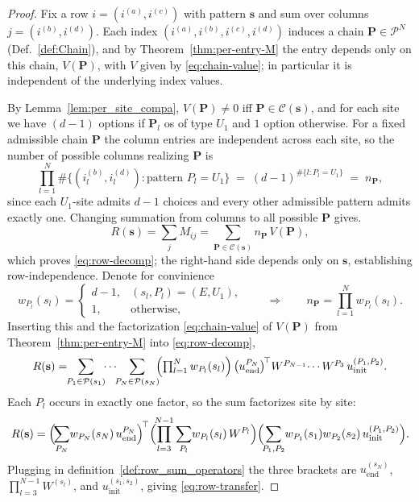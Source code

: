 \documentclass[12pt,a4paper]{article}
\begin{document}
\begin{proof}
Fix a row $i=(i^{(a)},i^{(c)})$ with pattern $\mathbf{s}$ and sum over columns $j=(i^{(b)},i^{(d)})$. Each index $(i^{(a)},i^{(b)},i^{(c)},i^{(d)})$ induces a chain $\mathbf{P}\in\mathcal{P}^N$ (Def.~\ref{def:Chain}), and by Theorem~\ref{thm:per-entry-M} the entry depends only on this chain, $V(\mathbf{P})$, with $V$ given by \eqref{eq:chain-value}; in particular it is independent of the underlying index values.

By Lemma~\ref{lem:per_site_compa}, $V(\mathbf{P})\neq 0$ iff $\mathbf{P}\in\mathcal{C}(\mathbf{s})$, and for each site we have $(d-1)$  options if $\mathbf{P}_l$  os of type $U_1$  and $1$  option otherwise. For a fixed admissible chain $\mathbf{P}$ the column entries are independent across each site, so the number of possible columns realizing $\mathbf{P}$ is
\[
\prod_{l=1}^N \#\{(i_l^{(b)},i_l^{(d)}) : \text{pattern }P_l=U_1\}
\;=\; (d-1)^{\#\{l:P_l=U_1\}} \;=\; n_{\mathbf{P}},
\]
since each $U_1$-site admits $d-1$ choices and every other admissible pattern admits exactly one. Changing summation from columns to all possible $\mathbf{P}$  gives.
\[
R(\mathbf{s})=\sum_j M_{ij}=\sum_{\mathbf{P}\in\mathcal{C}(\mathbf{s})} n_{\mathbf{P}}\,V(\mathbf{P}),
\]
which proves \eqref{eq:row-decomp}; the right-hand side depends only on $\mathbf{s}$, establishing row-independence.
Denote for convinience
\[
w_{P_l}(s_l)=
\begin{cases}
d-1, & (s_l,P_l)=(E,U_1),\\
1, & \text{otherwise},
\end{cases}
\qquad\Longrightarrow\qquad
n_{\mathbf{P}}=\prod_{l=1}^{N} w_{P_l}(s_l).
\]
Inserting this and the factorization \eqref{eq:chain-value} of $V(\mathbf{P})$ from Theorem~\ref{thm:per-entry-M} into \eqref{eq:row-decomp},
\[
R(\mathbf{s})
=\!\!\sum_{P_1\in\mathcal{P}(s_1)}\!\!\cdots\!\!\sum_{P_N\in\mathcal{P}(s_N)}\!\!\Bigl(\textstyle\prod_{l=1}^{N}w_{P_l}(s_l)\Bigr)\,\bigl(u_\mathrm{end}^{P_N}\bigr)^{\!\top} W^{P_{N-1}}\!\cdots W^{P_3}\,u_\mathrm{init}^{(P_1,P_2)}.
\]
Each $P_l$ occurs in exactly one factor, so the sum factorizes site by site:
\[
R(\mathbf{s})
=\Bigl(\!\sum_{P_N}\! w_{P_N}(s_N)\,u_\mathrm{end}^{P_N}\Bigr)^{\!\top}
\Bigl(\!\prod_{l=3}^{N-1}\sum_{P_l}\! w_{P_l}(s_l)\,W^{P_l}\Bigr)
\Bigl(\!\sum_{P_1,P_2}\! w_{P_1}(s_1)w_{P_2}(s_2)\,u_\mathrm{init}^{(P_1,P_2)}\Bigr).
\]
Plugging in definition~\ref{def:row_sum_operators} the three brackets are $u_\mathrm{end}^{(s_N)}$, $\prod_{l=3}^{N-1}W^{(s_l)}$, and $u_\mathrm{init}^{(s_1,s_2)}$, giving \eqref{eq:row-transfer}.
\end{proof}
\end{document}
